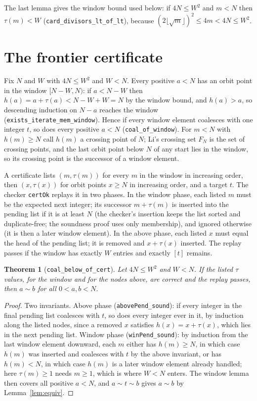 \documentclass[11pt]{article}
\theoremstyle{plain}
\newtheorem{theorem}{Theorem}[section]
\theoremstyle{definition}
\newcommand{\Coal}{\sim}
\begin{document}
The last lemma gives the window bound used below: if $4N\le W^2$ and $m<N$ then $\tau(m)<W$ (\texttt{card\_divisors\_lt\_of\_lt}), because $(2\lfloor\sqrt m\rfloor)^2\le 4m<4N\le W^2$.

\section{The frontier certificate}
\label{sec:cert}

Fix $N$ and $W$ with $4N\le W^2$ and $W<N$. Every positive $a<N$ has an orbit point in the window $[N-W,N)$: if $a<N-W$ then $h(a)=a+\tau(a)<N-W+W=N$ by the window bound, and $h(a)>a$, so descending induction on $N-a$ reaches the window (\texttt{exists\_iterate\_mem\_window}). Hence if every window element coalesces with one integer $t$, so does every positive $a<N$ (\texttt{coal\_of\_window}). For $m<N$ with $h(m)\ge N$ call $h(m)$ a crossing point of $N$; Li's crossing set $F_N$ is the set of crossing points, and the last orbit point below $N$ of any start lies in the window, so its crossing point is the successor of a window element.

A certificate lists $(m,\tau(m))$ for every $m$ in the window in increasing order, then $(x,\tau(x))$ for orbit points $x\ge N$ in increasing order, and a target $t$. The checker \texttt{certOk} replays it in two phases. In the window phase, each listed $m$ must be the expected next integer; its successor $m+\tau(m)$ is inserted into the pending list if it is at least $N$ (the checker's insertion keeps the list sorted and duplicate-free; the soundness proof uses only membership), and ignored otherwise (it is then a later window element). In the above phase, each listed $x$ must equal the head of the pending list; it is removed and $x+\tau(x)$ inserted. The replay passes if the window has exactly $W$ entries and exactly $[t]$ remains.

\begin{theorem}[\texttt{coal\_below\_of\_cert}]
\label{thm:cert}
Let $4N\le W^2$ and $W<N$. If the listed $\tau$ values, for the window and for the nodes above, are correct and the replay passes, then $a\Coal b$ for all $0<a,b<N$.
\end{theorem}

\begin{proof}
Two invariants. Above phase (\texttt{abovePend\_sound}): if every integer in the final pending list coalesces with $t$, so does every integer ever in it, by induction along the listed nodes, since a removed $x$ satisfies $h(x)=x+\tau(x)$, which lies in the next pending list. Window phase (\texttt{winPend\_sound}): by induction from the last window element downward, each $m$ either has $h(m)\ge N$, in which case $h(m)$ was inserted and coalesces with $t$ by the above invariant, or has $h(m)<N$, in which case $h(m)$ is a later window element already handled; here $\tau(m)\ge 1$ needs $m\ge1$, which is where $W<N$ enters. The window lemma then covers all positive $a<N$, and $a\Coal t\Coal b$ gives $a\Coal b$ by Lemma~\ref{lem:equiv}.
\end{proof}
\end{document}
